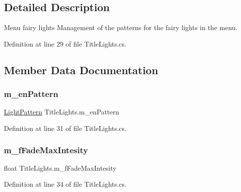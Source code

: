 \subsection{Detailed Description}
Menu fairy lights Management of the patterns for the fairy lights in the menu. 



Definition at line 29 of file Title\+Lights.\+cs.



\subsection{Member Data Documentation}
\mbox{\label{class_title_lights_af8aee6bf3ea00b4b358383b22b1798aa}} 
\subsubsection{\texorpdfstring{m\+\_\+en\+Pattern}{m\_enPattern}}
{\footnotesize\ttfamily \mbox{\hyperlink{_title_lights_8cs_a87e3f8652ad535a03a2b448824edab1c}{Light\+Pattern}} Title\+Lights.\+m\+\_\+en\+Pattern}



Definition at line 31 of file Title\+Lights.\+cs.

\mbox{\label{class_title_lights_a163d2c0d99fd988de11e766de52f0153}} 
\subsubsection{\texorpdfstring{m\+\_\+f\+Fade\+Max\+Intesity}{m\_fFadeMaxIntesity}}
{\footnotesize\ttfamily float Title\+Lights.\+m\+\_\+f\+Fade\+Max\+Intesity}



Definition at line 34 of file Title\+Lights.\+cs.

\mbox{\label{class_title_lights_aaed699cf6f7ab4b370640d10ac3dde58}} 
